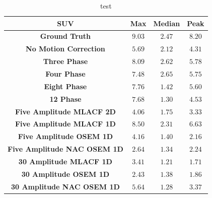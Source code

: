             \begin{table}
                \centering
                
                \captionsetup{singlelinecheck=false}
                \caption{
                    test
                }
                
                \resizebox*{1.0\linewidth}{!}
                {
                    \begin{tabular}{||c|ccc||}
                        \hline
                        \textbf{\gls{SUV}}                                      & \textbf{Max}  & \textbf{Median}   & \textbf{Peak} \\
                        \hline
                        \textbf{Ground Truth}                                   & $9.03$        & $2.47$            & $8.20$ \\
                        \textbf{No Motion Correction}                           & $5.69$        & $2.12$            & $4.31$ \\
                        \hline
                        \textbf{Three Phase}                                    & $8.09$        & $2.62$            & $5.78$ \\
                        \textbf{Four Phase}                                     & $7.48$        & $2.65$            & $5.75$ \\
                        \textbf{Eight Phase}                                    & $7.76$        & $1.42$            & $5.60$ \\
                        \textbf{12 Phase}                                       & $7.68$        & $1.30$            & $4.53$ \\
                        \hline
                        \textbf{Five Amplitude \gls{MLACF} \gls{2D}}            & $4.06$        & $1.75$            & $3.33$ \\
                        \textbf{Five Amplitude \gls{MLACF} \gls{1D}}            & $8.50$        & $2.31$            & $6.63$ \\
                        \textbf{Five Amplitude \gls{OSEM} \gls{1D}}             & $4.16$        & $1.40$            & $2.16$ \\
                        \textbf{Five Amplitude \gls{NAC} \gls{OSEM} \gls{1D}}   & $2.64$        & $1.34$            & $2.24$ \\
                        \hline
                        \textbf{30 Amplitude \gls{MLACF} \gls{1D}}              & $3.41$        & $1.21$            & $1.71$ \\
                        \textbf{30 Amplitude \gls{OSEM} \gls{1D}}               & $2.43$        & $1.38$            & $1.86$ \\
                        \textbf{30 Amplitude \gls{NAC} \gls{OSEM} \gls{1D}}     & $5.64$        & $1.28$            & $3.37$ \\
                        \hline
                    \end{tabular}
                }
                \label{tab:test_suv}
            \end{table}
            
